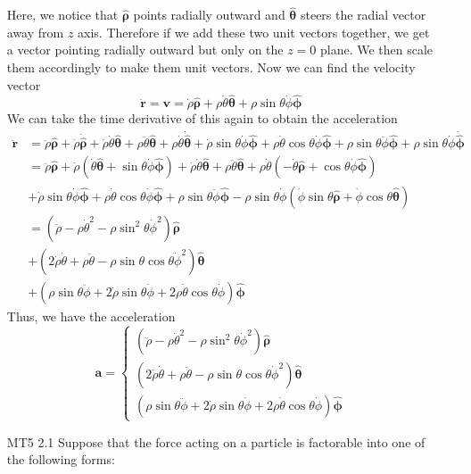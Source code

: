 \documentclass[12pt]{article}
\newcommand{\paren}[1]{\left( #1 \right)}
\newcommand{\untheta}{\hat{\boldsymbol\theta}}
\newcommand{\unphi}{\hat{\boldsymbol\phi}}
\newcommand{\unrho}{\hat{\boldsymbol\rho}}
\begin{document}
\begin{enumerate}
    Here, we notice that $\unrho$ points radially outward and $\untheta$ steers the radial vector away from $z$ axis. Therefore if we add these two unit vectors together, we get a vector pointing radially outward but only on the $z=0$ plane. We then scale them accordingly to make them unit vectors. 
    Now we can find the velocity vector
    \[
    \dot{\mathbf{r}} = \mathbf{v} = \dot{\rho}\unrho + \rho\dot{\theta}\untheta + \rho\sin\theta\dot{\phi}\unphi
    \]
    We can take the time derivative of this again to obtain the acceleration
    \begin{align*}
        \ddot{\mathbf{r}}   &= \ddot{\rho}\unrho + \dot{\rho}\dot{\unrho} + \dot{\rho}\dot{\theta}\untheta + \rho\ddot{\theta}\untheta +\rho\dot{\theta}\dot{\untheta} + \dot{\rho}\sin\theta\dot{\phi}\unphi + \rho\dot{\theta}\cos\theta\dot{\phi}\unphi + \rho\sin\theta\ddot{\phi}\unphi +\rho\sin\theta\dot{\phi}\dot{\unphi}\\
                            &= \ddot{\rho}\unrho + \dot{\rho}\paren{\dot{\theta}\untheta + \sin\theta\dot{\phi}\unphi} + \dot{\rho}\dot{\theta}\untheta + \rho\ddot{\theta}\untheta + \rho\dot{\theta}\paren{-\dot{\theta}\unrho + \cos\theta\dot{\phi}\unphi} \\
                            &+ \dot{\rho}\sin\theta\dot{\phi}\unphi + \rho\dot{\theta}\cos\theta\dot{\phi}\unphi + \rho\sin\theta\ddot{\phi}\unphi - \rho\sin\theta\dot{\phi}\paren{\dot\phi\sin\theta\unrho + \dot\phi\cos\theta\untheta}\\
                            &=\paren{\ddot{\rho} - \rho\dot{\theta}^2-\rho\sin^2\theta\dot\phi^2}\unrho\\
                            &+\paren{2\dot\rho\dot\theta + \rho\ddot{\theta} -\rho\sin\theta\cos\theta\dot\phi^2}\untheta\\
                            &+\paren{\rho\sin\theta\ddot{\phi}+2\dot\rho\sin\theta\dot\phi + 2\rho\dot\theta\cos\theta\dot\phi} \unphi
    \end{align*}
    Thus, we have the acceleration
    \[
    \mathbf{a} = \begin{cases}
        \paren{\ddot{\rho} - \rho\dot{\theta}^2-\rho\sin^2\theta\dot\phi^2}\unrho\\
        \paren{2\dot\rho\dot\theta + \rho\ddot{\theta} -\rho\sin\theta\cos\theta\dot\phi^2}\untheta\\
        \paren{\rho\sin\theta\ddot{\phi}+2\dot\rho\sin\theta\dot\phi + 2\rho\dot\theta\cos\theta\dot\phi} \unphi
    \end{cases}
    \]
    \newpage
    \item[MT5 2.1] Suppose that the force acting on a particle is factorable into one of the following forms:


\end{enumerate}
\end{document}
